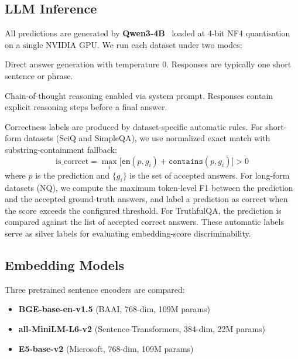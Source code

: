 \documentclass{article}
\begin{document}
\subsection{LLM Inference}

All predictions are generated by \textbf{Qwen3-4B}~\citep{qwen3} loaded at 4-bit
NF4 quantisation on a single NVIDIA GPU.
We run each dataset under two modes:

\begin{description}[nosep]
  \item[\texttt{no\_thinking}] Direct answer generation with temperature 0.
        Responses are typically one short sentence or phrase.
  \item[\texttt{thinking}] Chain-of-thought reasoning enabled via system prompt.
        Responses contain explicit reasoning steps before a final answer.
\end{description}

Correctness labels are produced by dataset-specific automatic rules.
For short-form datasets (SciQ and SimpleQA), we use normalized exact match with
substring-containment fallback:
\begin{equation}
  \text{is\_correct} = \max_i \bigl[\texttt{em}(p, g_i) + \texttt{contains}(p, g_i)\bigr] > 0
\end{equation}
where $p$ is the prediction and $\{g_i\}$ is the set of accepted answers.
For long-form datasets (NQ), we compute the maximum token-level F1 between the
prediction and the accepted ground-truth answers, and label a prediction as correct
when the score exceeds the configured threshold.
For TruthfulQA, the prediction is compared against the list of accepted correct answers.
These automatic labels serve as silver labels for evaluating embedding-score discriminability.

\subsection{Embedding Models}

Three pretrained sentence encoders are compared:
\begin{itemize}[nosep]
  \item \textbf{BGE-base-en-v1.5} (BAAI, 768-dim, 109M params)
  \item \textbf{all-MiniLM-L6-v2} (Sentence-Transformers, 384-dim, 22M params)
  \item \textbf{E5-base-v2} (Microsoft, 768-dim, 109M params)
\end{itemize}
\end{document}
